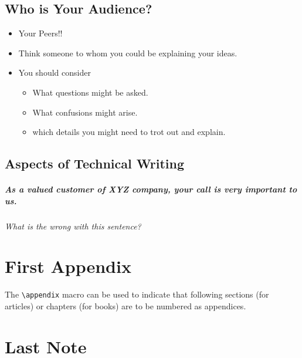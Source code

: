 \documentclass[]{report}
\begin{document}
  \section{Who is Your Audience?}
   \begin{itemize}
   \item Your Peers!!
   \item Think someone to whom you could be explaining your ideas.
   \item You should consider
   \begin{itemize}
   \item What questions might be asked.
   \item What confusions might arise.
   \item which details you might need to trot out and explain.
   \end{itemize}
  \end{itemize}
  
  
  \section{Aspects of Technical Writing}
  \paragraph{As a valued customer of XYZ company, your call is very
important to us.}
\begin{center}
\emph{{\Large What is the wrong with this sentence?}}
\end{center}
  \chapter{First Appendix}
  The \verb|\appendix| macro can be used to indicate that following sections (for articles) or chapters (for books) are to be numbered as appendices.
  
  \chapter{Last Note}
\end{document}
